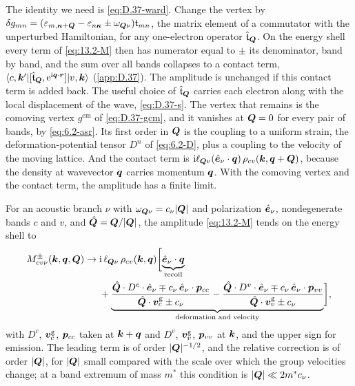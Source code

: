 The identity we need is \cref{eq:D.37-ward}. Change the vertex by $\delta g_{mn} = (\varepsilon_{m,\bm{\kappa}+\bm{Q}} - \varepsilon_{n\bm{\kappa}} \pm \omega_{\bm{Q}\nu})\mathfrak{t}_{mn}$, the matrix element of a commutator with the unperturbed Hamiltonian, for any one-electron operator $\hat{\mathfrak{t}}_{\bm{Q}}$. On the energy shell every term of \cref{eq:13.2-M} then has numerator equal to $\pm$ its denominator, band by band, and the sum over all bands collapses to a contact term, $\langle c,\bm{k}'|[\hat{\mathfrak{t}}_{\bm{Q}},\mathrm{e}^{\mathrm{i}\bm{q}\cdot\bm{r}}]|v,\bm{k}\rangle$ (\cref{app:D.37}). The amplitude is unchanged if this contact term is added back. The useful choice of $\hat{\mathfrak{t}}_{\bm{Q}}$ carries each electron along with the local displacement of the wave, \cref{eq:D.37-s}. The vertex that remains is the comoving vertex $g^{\mathrm{cm}}$ of \cref{eq:D.37-gcm}, and it vanishes at $\bm{Q} = 0$ for every pair of bands, by \cref{eq:6.2-asr}. Its first order in $\bm{Q}$ is the coupling to a uniform strain, the deformation-potential tensor $D^n$ of \cref{eq:6.2-D}, plus a coupling to the velocity of the moving lattice. And the contact term is $\mathrm{i}\ell_{\bm{Q}\nu}(\hat{\bm{e}}_\nu\cdot\bm{q})\,\rho_{cv}(\bm{k},\bm{q}+\bm{Q})$, because the density at wavevector $\bm{q}$ carries momentum $\bm{q}$. With the comoving vertex and the contact term, the amplitude has a finite limit.
\begin{keyresult}
For an acoustic branch $\nu$ with $\omega_{\bm{Q}\nu} = c_\nu|\bm{Q}|$ and polarization $\hat{\bm{e}}_\nu$, nondegenerate bands $c$ and $v$, and $\hat{\bm{Q}} = \bm{Q}/|\bm{Q}|$, the amplitude \cref{eq:13.2-M} tends on the energy shell to
\begin{equation}
  \begin{split}
  M^\pm_{cv\nu}(\bm{k},\bm{q},\bm{Q}) \to{}& \mathrm{i}\,\ell_{\bm{Q}\nu}\,\rho_{cv}(\bm{k},\bm{q})
  \biggl[\underbrace{\hat{\bm{e}}_\nu\cdot\bm{q}}_{\text{recoil}}\\
  &+ \underbrace{\frac{\hat{\bm{Q}}\cdot D^c\cdot\hat{\bm{e}}_\nu \mp c_\nu\,\hat{\bm{e}}_\nu\cdot\bm{p}_{cc}}{\hat{\bm{Q}}\cdot\bm{v}^{\mathrm{g}}_c \pm c_\nu}
  - \frac{\hat{\bm{Q}}\cdot D^v\cdot\hat{\bm{e}}_\nu \mp c_\nu\,\hat{\bm{e}}_\nu\cdot\bm{p}_{vv}}{\hat{\bm{Q}}\cdot\bm{v}^{\mathrm{g}}_v \pm c_\nu}}_{\text{deformation and velocity}}\biggr] ,
  \end{split}
  \label{eq:13.6-soft}
\end{equation}
with $D^c$, $\bm{v}^{\mathrm{g}}_c$, $\bm{p}_{cc}$ taken at $\bm{k}+\bm{q}$ and $D^v$, $\bm{v}^{\mathrm{g}}_v$, $\bm{p}_{vv}$ at $\bm{k}$, and the upper sign for emission. The leading term is of order $|\bm{Q}|^{-1/2}$, and the relative correction is of order $|\bm{Q}|$, for $|\bm{Q}|$ small compared with the scale over which the group velocities change; at a band extremum of mass $m^*$ this condition is $|\bm{Q}| \ll 2m^*c_\nu$.
\end{keyresult}
